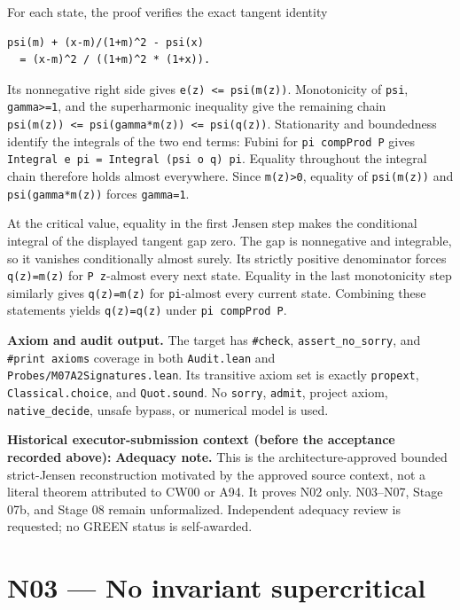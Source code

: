 \documentclass[
  11pt,
]{article}
\let\LedgerOriginalTexttt\texttt
\renewcommand{\texttt}[1]{{\small\LedgerOriginalTexttt{#1}}}
\begin{document}
For each state, the proof verifies the exact tangent identity

\begin{verbatim}
psi(m) + (x-m)/(1+m)^2 - psi(x)
  = (x-m)^2 / ((1+m)^2 * (1+x)).
\end{verbatim}

Its nonnegative right side gives \texttt{e(z)\ \textless{}=\ psi(m(z))}.
Monotonicity of \texttt{psi}, \texttt{gamma\textgreater{}=1}, and the
superharmonic inequality give the remaining chain
\texttt{psi(m(z))\ \textless{}=\ psi(gamma*m(z))\ \textless{}=\ psi(q(z))}.
Stationarity and boundedness identify the integrals of the two end
terms: Fubini for \texttt{pi\ compProd\ P} gives
\texttt{Integral\ e\ pi\ =\ Integral\ (psi\ o\ q)\ pi}. Equality
throughout the integral chain therefore holds almost everywhere. Since
\texttt{m(z)\textgreater{}0}, equality of \texttt{psi(m(z))} and
\texttt{psi(gamma*m(z))} forces \texttt{gamma=1}.

At the critical value, equality in the first Jensen step makes the
conditional integral of the displayed tangent gap zero. The gap is
nonnegative and integrable, so it vanishes conditionally almost surely.
Its strictly positive denominator forces
\texttt{q(z\textquotesingle{})=m(z)} for \texttt{P\ z}-almost every next
state. Equality in the last monotonicity step similarly gives
\texttt{q(z)=m(z)} for \texttt{pi}-almost every current state. Combining
these statements yields \texttt{q(z\textquotesingle{})=q(z)} under
\texttt{pi\ compProd\ P}.

\textbf{Axiom and audit output.} The target has \texttt{\#check},
\texttt{assert\_no\_sorry}, and \texttt{\#print\ axioms} coverage in
both \texttt{Audit.lean} and \texttt{Probes/M07A2Signatures.lean}. Its
transitive axiom set is exactly \texttt{propext},
\texttt{Classical.choice}, and \texttt{Quot.sound}. No \texttt{sorry},
\texttt{admit}, project axiom, \texttt{native\_decide}, unsafe bypass,
or numerical model is used.

\textbf{Historical executor-submission context (before the acceptance
recorded above):} \textbf{Adequacy note.} This is the
architecture-approved bounded strict-Jensen reconstruction motivated by
the approved source context, not a literal theorem attributed to CW00 or
A94. It proves N02 only. N03--N07, Stage 07b, and Stage 08 remain
unformalized. Independent adequacy review is requested; no GREEN status
is self-awarded.

\section{N03 --- No invariant
supercritical}\label{n03-no-invariant-supercritical}
\end{document}
